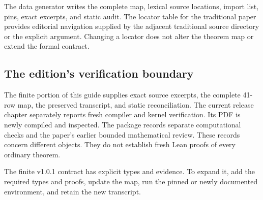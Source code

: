 The data generator writes the complete map, lexical source locations, import list, pins, exact excerpts, and static audit. The locator table for the traditional paper provides editorial navigation supplied by the adjacent traditional source directory or the explicit  argument. Changing a locator does not alter the theorem map or extend the formal contract.

\subsection{The edition's verification boundary}
The finite portion of this guide supplies exact source excerpts, the complete 41-row map, the preserved transcript, and static reconciliation. The current release chapter separately reports fresh compiler and kernel verification. Its PDF is newly compiled and inspected. The package records separate computational checks and the paper's earlier bounded mathematical review. These records concern different objects. They do not establish fresh Lean proofs of every ordinary theorem.

The finite v1.0.1 contract has explicit types and evidence. To expand it, add the required types and proofs, update the map, run the pinned or newly documented environment, and retain the new transcript.
